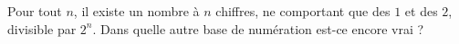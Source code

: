 Pour tout $n$, il existe un nombre à $n$ chiffres, ne comportant que des $1$ et des $2$, divisible par $2^n$. Dans quelle autre base de numération est-ce encore vrai ?
